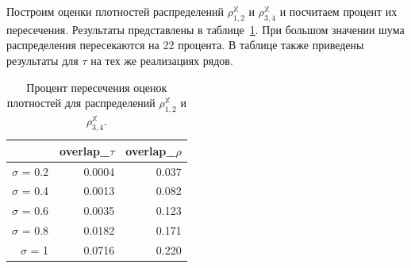 \documentclass[specialist,
               substylefile = spbu.rtx,
               subf,href,colorlinks=true, 12pt]{disser}
\begin{document}
{{Построим оценки плотностей распределений $\rho^{\mathbb{X}}_{1,2}$  и  $\rho^{\mathbb{X}}_{3,4}$  и посчитаем процент их пересечения. Результаты представлены в таблице~\ref{tab:model_dist_pgram_overlap22}. При большом значении шума распределения пересекаются на 22 процента.
В таблице также приведены результаты для $\tau$ на тех же реализациях рядов.

\begin{table}[hhh!]
\caption{Процент пересечения оценок плотностей для распределений $\rho^{\mathbb{X}}_{1,2}$  и $\rho^{\mathbb{X}}_{3,4}$.}
\centering
\begin{tabular}{rrr}
  \hline
& overlap\_$\tau$& overlap\_$\rho$ \\ 
  \hline
$\sigma$ = 0.2 & 0.0004 & 0.037 \\ 
  $\sigma$ = 0.4 & 0.0013 & 0.082 \\ 
  $\sigma$ = 0.6 & 0.0035 & 0.123 \\ 
  $\sigma$ = 0.8 & 0.0182 & 0.171 \\ 
  $\sigma$ = 1 & 0.0716 & 0.220 \\ 
   \hline
\end{tabular}
\label{tab:model_dist_pgram_overlap22}
\end{table}
%
%
%
%
%
}}
\end{document}
